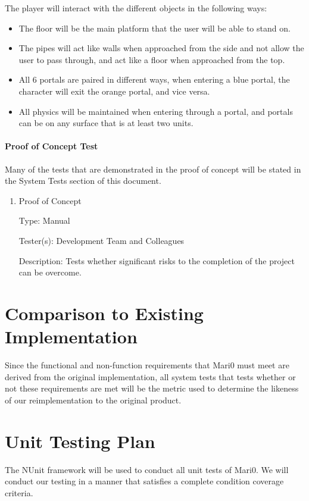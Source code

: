 \documentclass[12pt, titlepage]{article}
\begin{document}
The player will interact with the different objects in the following ways:
\begin{itemize}  
\item The floor will be the main platform that the user will be able to stand on.
\item The pipes will act like walls when approached from the side and not allow the user to pass through, and act like a floor when approached from the top.
\item All 6 portals are paired in different ways, when entering a blue portal, the character will exit the orange portal, and vice versa.
\item All physics will be maintained when entering through a portal, and portals can be on any surface that is at least two units.
\end{itemize}


\paragraph{Proof of Concept Test}

Many of the tests that are demonstrated in the proof of concept will be stated in the System Tests section of this document.

\begin{enumerate}

\item{Proof of Concept}

Type: Manual

Tester(s): Development Team and Colleagues

Description: Tests whether significant risks to the completion of the project can be overcome.

\end{enumerate}
	
\section{Comparison to Existing Implementation}	
	Since the functional and non-function requirements that Mari0 must meet are derived from the original implementation, all system tests that tests whether or not these requirements are met will be the metric used to determine the likeness of our reimplementation to the original product.
\section{Unit Testing Plan}
	The NUnit framework will be used to conduct all unit tests of Mari0. We will conduct our testing in a manner that satisfies a complete condition coverage criteria.
\end{document}
